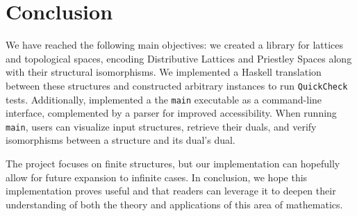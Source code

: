 
\section{Conclusion}\label{sec:Conclusion}

We have reached the following main objectives: we created a library for lattices and topological spaces, encoding Distributive Lattices and Priestley Spaces along with their structural isomorphisms. We implemented a Haskell translation between these structures and constructed arbitrary instances to run \texttt{QuickCheck} tests. Additionally, implemented a the \texttt{main} executable as a command-line interface, complemented by a parser for improved accessibility. When running \texttt{main}, users can visualize input structures, retrieve their duals, and verify isomorphisms between a structure and its dual’s dual.

The project focuses on finite structures, but our implementation can hopefully allow for future expansion to infinite cases. In conclusion, we hope this implementation proves useful and that readers can leverage it to deepen their understanding of both the theory and applications of this area of mathematics.